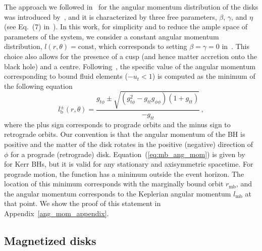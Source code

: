 \documentclass[twocolumn,aps,showpacs,showkeys,prd,superscriptaddress,byrevtex, amsmath]{revtex4-1}
\begin{document}
The approach we followed in~\cite{Gimeno-Soler:2017} for the angular momentum distribution of the disks was introduced by~\cite{Qian:2009}, and it is characterized by three free parameters, $\beta$, $\gamma$, and $\eta$ (see Eq.~(7) in~\cite{Gimeno-Soler:2017}). In this work, for simplicity and to reduce the ample space of parameters of the system, we consider a constant angular momentum distribution, $l(r,\theta) = \mathrm{const}$, which corresponds to setting $\beta=\gamma=0$ in~\cite{Gimeno-Soler:2017}. This choice also allows for the presence of a cusp (and hence matter accretion onto the black hole) and a centre. Following~\citep{Daigne:2004}, the specific value of the angular momentum corresponding to bound fluid elements ($-u_t<1$) is computed as the minimum of the following equation
\begin{equation}\label{eq:mb_ang_mom}
l^{\pm}_{\mathrm{b}}(r, \theta) = \frac{g_{t\phi} \pm \sqrt{ (g_{t\phi}^2-g_{tt}g_{\phi\phi})  (1+g_{tt}) } }{-g_{tt}}\,,
\end{equation}
where the plus sign corresponds to prograde orbits and the minus sign to retrograde orbits. Our convention is that the angular momentum of the BH is positive and the matter of the disk rotates in the positive (negative) direction of $\phi$ for a prograde (retrograde) disk.
Equation~(\ref{eq:mb_ang_mom}) is given by~\citep{Daigne:2004} for Kerr BHs, but it is valid for any stationary and axisymmetric spacetime. For prograde motion, the function has a minimum outside the event horizon. The location of this minimum corresponds with the marginally bound orbit $r_{\mathrm{mb}}$, and the angular momentum corresponds to the Keplerian angular momentum $l_{\mathrm{mb}}$ at that point. We show the proof of this statement in Appendix~\ref{ang_mom_appendix}.

\subsection{Magnetized disks}
\end{document}
